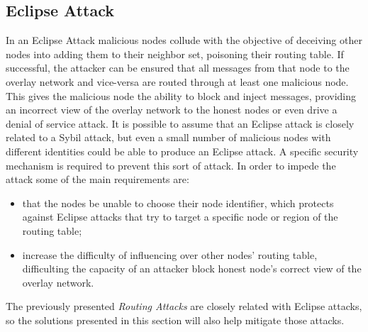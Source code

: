\subsection{Eclipse Attack}
In an Eclipse Attack\cite{Singh2006} malicious nodes collude with the objective of deceiving other nodes into adding them to their neighbor set, poisoning their routing table.
If successful, the attacker can be ensured that all messages from that node to the overlay network and vice-versa are routed through at least one malicious node.
This gives the malicious node the ability to block and inject messages, providing an incorrect view of the overlay network to the honest nodes or even drive a denial of service attack.
It is possible to assume that an Eclipse attack is closely related to a Sybil attack, but even a small number of malicious nodes with different identities could be able to produce an Eclipse attack.
A specific security mechanism is required to prevent this sort of attack.
In order to impede the attack some of the main requirements are:
\begin{itemize}
	\item that the nodes be unable to choose their node identifier, which protects against Eclipse attacks that try to target a specific node or region of the routing table;
	\item increase the difficulty of influencing over other nodes' routing table, difficulting the capacity of an attacker block honest node's correct view of the overlay network.
\end{itemize}
The previously presented \textit{Routing Attacks} are closely related with Eclipse attacks, so the solutions presented in this section will also help mitigate those attacks.

